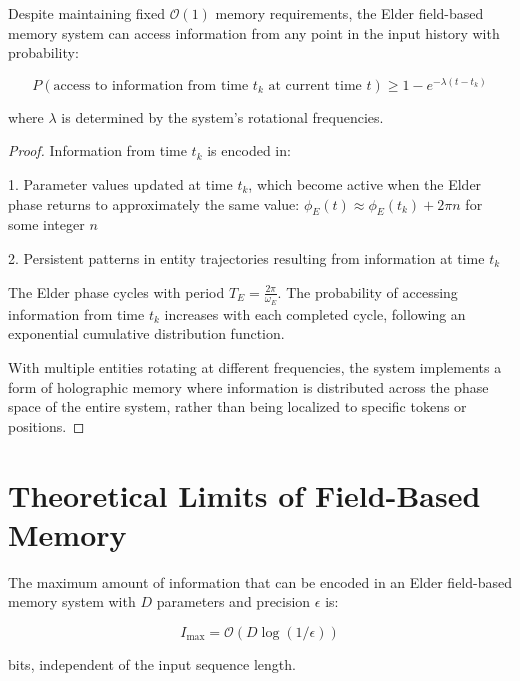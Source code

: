 \begin{theorem}
Despite maintaining fixed $\mathcal{O}(1)$ memory requirements, the Elder field-based memory system can access information from any point in the input history with probability:

\begin{equation}
P(\text{access to information from time } t_k \text{ at current time } t) \geq 1 - e^{-\lambda (t-t_k)}
\end{equation}

where $\lambda$ is determined by the system's rotational frequencies.
\end{theorem}

\begin{proof}
Information from time $t_k$ is encoded in:

1. Parameter values updated at time $t_k$, which become active when the Elder phase returns to approximately the same value: $\phi_E(t) \approx \phi_E(t_k) + 2\pi n$ for some integer $n$

2. Persistent patterns in entity trajectories resulting from information at time $t_k$

The Elder phase cycles with period $T_E = \frac{2\pi}{\omega_E}$. The probability of accessing information from time $t_k$ increases with each completed cycle, following an exponential cumulative distribution function.

With multiple entities rotating at different frequencies, the system implements a form of holographic memory where information is distributed across the phase space of the entire system, rather than being localized to specific tokens or positions.
\end{proof}

\section{Theoretical Limits of Field-Based Memory}

\begin{theorem}
The maximum amount of information that can be encoded in an Elder field-based memory system with $D$ parameters and precision $\epsilon$ is:

\begin{equation}
I_{\max} = \mathcal{O}(D \log(1/\epsilon))
\end{equation}

bits, independent of the input sequence length.
\end{theorem}

